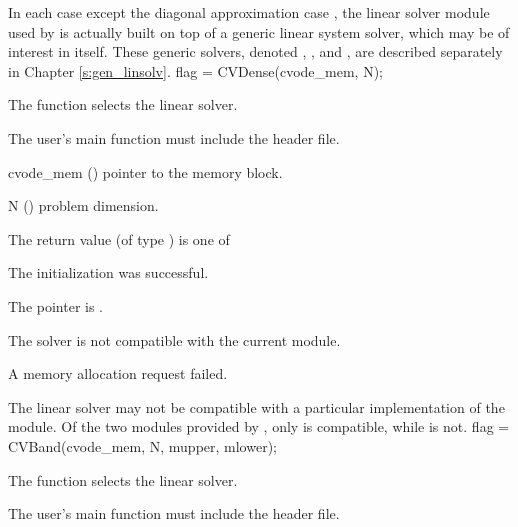 In each case except the diagonal approximation case {\cvdiag}, the linear
solver module used by {\cvode} is actually built on top of a generic
linear system solver, which may be of interest in itself.  These
generic solvers, denoted {\dense}, {\band}, and {\spgmr}, are described
separately in Chapter \ref{s:gen_linsolv}.
{
  flag = CVDense(cvode\_mem, N);
}
{
  The function  selects the {\cvdense} linear solver. 

  The user's main function must include the  header file.
}
{
  \begin{args}
  \item[cvode\_mem] ()
    pointer to the {\cvode} memory block.
  \item[N] ()
    problem dimension.
  \end{args}
}
{
  The return value  (of type ) is one of
  \begin{args}
  \item[\Id{CVDENSE\_SUCCESS}] 
    The {\cvdense} initialization was successful.
  \item[\Id{CVDENSE\_MEM\_NULL}]
    The  pointer is .
  \item[\Id{CVDENSE\_ILL\_INPUT}]
    The {\cvdense} solver is not compatible with the current {\nvector} module.
  \item[\Id{CVDENSE\_MEM\_FAIL}]
    A memory allocation request failed.
  \end{args}
}
{
  The {\cvdense} linear solver may not be compatible with a particular
  implementation of the {\nvector} module. 
  Of the two {\nvector} modules provided by {\sundials}, only {\nvecs} is 
  compatible, while {\nvecp} is not.
}
{
  flag = CVBand(cvode\_mem, N, mupper, mlower);
}
{
  The function  selects the {\cvband} linear solver. 

  The user's main function must include the  header file.
}
